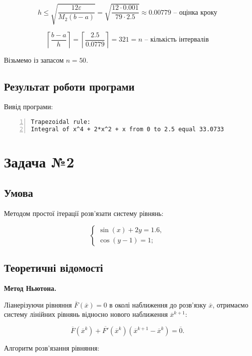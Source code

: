 \documentclass[a4paper, 12pt]{article}
\begin{document}
\[ h \leq \sqrt{\frac{12\varepsilon}{M_2(b-a)}} = \sqrt{\frac{12 \cdot 0.001}{79 \cdot 2.5}} \approx 0.00779 \text{ -- оцінка кроку}\]

\[ \left \lceil \frac{b-a}{h} \right \rceil = \left \lceil \frac{2.5}{0.0779} \right \rceil = 321 = n \text{ -- кількість інтервалів} \]

Візьмемо із запасом $n = 50$.

\subsection{Результат роботи програми}

Вивід програми:

\begin{Verbatim}[numbers=left,xleftmargin=20mm]
Trapezoidal rule:
Integral of x^4 + 2*x^2 + x from 0 to 2.5 equal 33.0733
\end{Verbatim}


\newpage
\section{Задача №2}

\subsection{Умова}

Методом простої ітерації розв'язати систему рівнянь:

\[
\begin{cases}
\sin(x) + 2y = 1.6, \\
\cos(y-1) = 1;
\end{cases}
\]

\subsection{Теоретичні відомості}

\textbf{Метод Ньютона.}

Ліанерізуючи рівняння $\overline{F}(\overline{x})=0$ в околі наближення до розв'язку $\overline{x}$, отримаємо систему лінійних рівнянь відносно нового наближення $\overline{x}^{k+1}$:

\[
\overline{F}\left(\overline{x}^{k}\right)+\overline{F'}\left(\overline{x}^{k}\right)\left(\overline{{x}}^{k+1}-\overline{{x}}^{k}\right) = \overline{0}.
\]

Алгоритм розв'язання рівняння:
\end{document}
